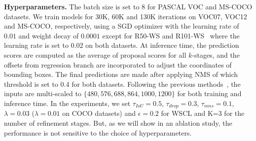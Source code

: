 \documentclass[runningheads]{llncs}
\begin{document}
\noindent\textbf{Hyperparameters.}
The batch size is set to $8$ for PASCAL VOC and MS-COCO datasets. We train models for 30K, 60K and 130K iterations on VOC07, VOC12 and MS-COCO, respectively, using a SGD optimizer with the learning rate of $0.01$ and weight decay of $0.0001$ except for R50-WS and R101-WS~\cite{shen2020enabling} where the learning rate is set to $0.02$ on both datasets.
At inference time, the prediction scores are computed as the average of proposal scores for all $k$-stages, and the offsets from regression branch are incorporated to adjust the coordinates of bounding boxes.
The final predictions are made after applying NMS of which threshold is set to 0.4 for both datasets.
Following the previous methods~\cite{ren2020instance,Tang_2017_CVPR,huang2020comprehensive}, the inputs are multi-scaled to $\{480, 576, 688, 864, 1000, 1200\}$ for both training and inference time.
In the experiments, we set $\tau_{IoU} = 0.5$, $\tau_{drop} = 0.3$, $\tau_{nms} = 0.1$, $\lambda = 0.03$ ($\lambda = 0.01$ on COCO datasets) and $\epsilon = 0.2$ for WSCL and K=3 for the number of refinement stages. But, as we will show in an ablation study, the performance is not sensitive to the choice of hyperparameters.
\end{document}
